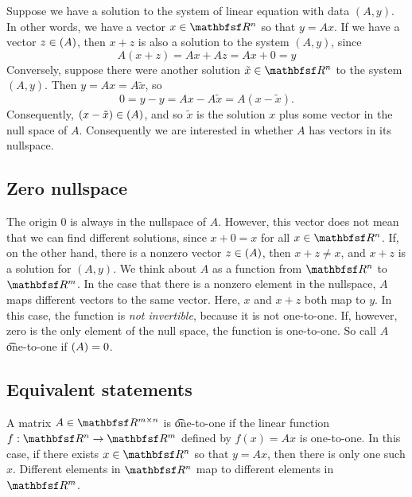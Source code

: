 Suppose we have a solution to the system of linear equation with data $(A, y)$.
In other words, we have a vector $x \in \R ^n$ so that $y = Ax$.
If we have a vector $z \in \null(A)$, then $x + z$ is also a solution to the system $(A, y)$, since
\[
A(x + z) = Ax + Az = Ax + 0 = y
\]
Conversely, suppose there were another solution $\tilde{x} \in \R ^{n}$ to the system $(A, y)$.
Then $y = Ax = A\tilde{x}$, so
\[
0 = y - y = Ax - A\tilde{x} = A(x - \tilde{x}).
\]
Consequently, $(x - \tilde{x}) \in \null(A)$, and so $\tilde{x}$ is the solution $x$ plus some vector in the null space of $A$.
Consequently we are interested in whether $A$ has vectors in its nullspace.

\subsection*{Zero nullspace}

The origin $0$ is always in the nullspace of $A$.
However, this vector does not mean that we can find different solutions, since $x + 0 = x$ for all $x \in \R ^n$.
If, on the other hand, there is a nonzero vector $z \in \null(A)$, then $x + z \neq x$, and $x+z$ is a solution for $(A, y)$.
We think about $A$ as a function from $\R ^n$ to $\R ^m$.
In the case that there is a nonzero element in the nullspace, $A$ maps different vectors to the same vector.
Here, $x$ and $x + z$ both map to $y$.
In this case, the function is \textit{not invertible}, because it is not one-to-one.
If, however, zero is the only element of the null space, the function is one-to-one.
So call $A$ \t{one-to-one} if $\null(A) = 0$.

\subsection*{Equivalent statements}

A matrix $A \in \R ^{m \times  n}$ is \t{one-to-one} if the linear function $f: \R ^n \to \R ^m$ defined by $f(x) = Ax$ is one-to-one.
In this case, if there exists $x \in \R ^n$ so that $y = Ax$, then there is only one such $x$.
Different elements in $\R ^n$ map to different elements in $\R ^m$.

\blankpage
